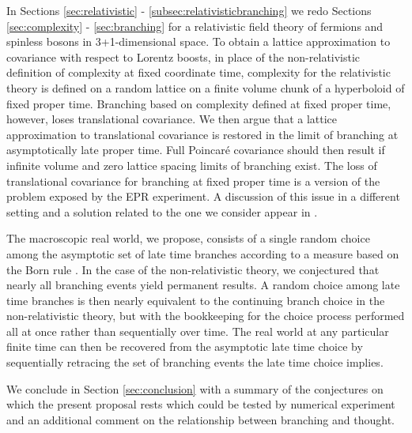 \documentclass[twocolumn,amsmath,amssymb]{revtex4-1}
\begin{document}
In Sections \ref{sec:relativistic} - \ref{subsec:relativisticbranching}
we redo Sections \ref{sec:complexity} - \ref{sec:branching}
for a relativistic field theory of fermions and spinless bosons
in 3+1-dimensional space.
To obtain a lattice approximation to covariance with respect to Lorentz boosts,
in place of the non-relativistic definition 
of complexity at fixed coordinate time, complexity for the relativistic theory 
is defined on a random lattice on a finite volume chunk 
of a hyperboloid of fixed proper time. 
Branching based on complexity defined at fixed proper time, however,
loses translational covariance. We then argue that
a lattice approximation to translational covariance
is restored in the limit of branching at asymptotically late
proper time. Full Poincar\'{e} covariance should
then result if infinite volume and
zero lattice spacing limits of branching exist.
The loss of translational covariance for
branching at fixed proper time is a version of
the problem exposed by the EPR experiment.
A discussion of this issue in
a different setting and a solution related to
the one we consider appear in \cite{Kent, Kent1, Kent2}.

The macroscopic real world, we propose, consists of a single random choice
among the asymptotic set of late time branches according to a measure
based on the Born rule \cite{Weingarten1}.
In the case of the non-relativistic theory, we conjectured that
nearly all branching events yield permanent results.
A random choice among late time branches
is then nearly equivalent to the continuing branch choice in the non-relativistic
theory, but with the bookkeeping for the choice process performed all at once
rather than sequentially over time.
The real world at any particular finite time can then be recovered from the asymptotic late time choice
by sequentially retracing the set of branching
events the late time choice implies.


We conclude in Section \ref{sec:conclusion} with
a summary of the conjectures
on which the present proposal rests
which could be tested by numerical experiment
and an additional comment on the relationship between branching
and thought. 
\end{document}
